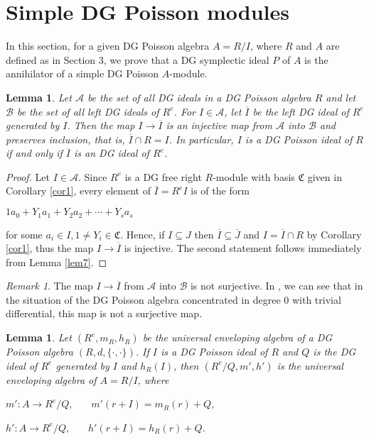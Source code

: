 \documentclass[a4paper,10pt]{amsart}
\newtheorem{lemma}[theorem]{Lemma}
\theoremstyle{definition}
\theoremstyle{remark}
\newtheorem{remark}[theorem]{Remark}
\numberwithin{equation}{section}
\begin{document}
\medskip
\section{Simple DG Poisson modules}
In this section, for a given DG Poisson algebra $A=R/I$, where
$R$ and $A$ are defined as in Section 3, we prove that a DG symplectic ideal $P$ of
$A$ is the annihilator of a simple DG Poisson $A$-module.

\begin{lemma}\label{lem8}
Let $\mathcal{A}$ be the set of all DG ideals in a DG Poisson
algebra $R$ and let $\mathcal{B}$ be the set of all left DG ideals
of $R^{e}$. For $I\in \mathcal{A}$,
let $\overline{I}$ be the left DG ideal of $R^{e}$ generated by $I$.
Then the map $I\rightarrow \overline{I}$ is an injective map from
$\mathcal{A}$ into $\mathcal{B}$ and preserves inclusion, that is,
$\overline{I}\cap R=I$. In particular, $I$ is a DG Poisson ideal of
$R$ if and only if $\overline{I}$ is an DG ideal of $R^{e}$.
\end{lemma}

\begin{proof}
Let $I\in \mathcal{A}$. Since $R^{e}$ is a DG free right
$R$-module with basis $\mathfrak{C}$ given in Corollary \ref{cor1}, every
element of $\overline{I}=R^{e}I$ is of the form
\begin{center}
$1a_0+Y_1a_1+Y_2a_2+\cdots+Y_sa_s$
\end{center}
for some $a_i\in I, 1\neq Y_i\in \mathfrak{C}$. Hence, if
$I\subseteq J$ then $\overline{I}\subseteq \overline{J}$ and
$I=\overline{I}\cap R$ by Corollary \ref{cor1}, thus the map $I\rightarrow
\overline{I}$ is injective. The second statement follows immediately
from Lemma \ref{lem7}.
\end{proof}

\begin{remark}
The map $I\rightarrow \overline{I}$ from $\mathcal{A}$ into
$\mathcal{B}$ is not surjective. In \cite{OPS}, we can see that  in
the situation of the DG Poisson algebra concentrated in degree 0
with trivial differential, this map is not a surjective map.
\end{remark}

\begin{lemma}\label{lem6}
Let $(R^{e}, m_R, h_R)$ be the universal enveloping algebra of a DG
Poisson algebra $(R, d, \{\cdot, \cdot\})$. If
$I$ is a DG Poisson ideal of $R$ and $Q$ is the DG ideal of $R^{e}$
generated by $I$ and $h_R(I)$, then $(R^{e}/Q, m', h')$ is the
universal enveloping algebra of $A=R/I$, where
\begin{center}
$m': A\rightarrow R^{e}/Q, ~~~~~~~~m'(r+I)=m_R(r)+Q$,
\end{center}
\begin{center}
$h': A\rightarrow R^{e}/Q, ~~~~~~~~h'(r+I)=h_R(r)+Q$.
\end{center}
\end{lemma}
\end{document}
